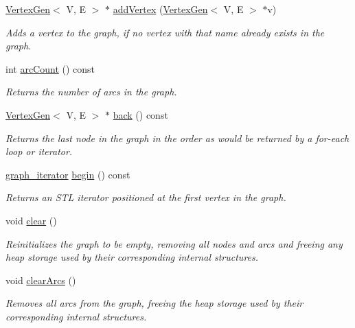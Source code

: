 \begin{DoxyCompactItemize}
\mbox{\hyperlink{classVertexGen}{Vertex\+Gen}}$<$ V, E $>$ $\ast$ \mbox{\hyperlink{classBasicGraphGen_a99facea785e991d862eef401807c5f79}{add\+Vertex}} (\mbox{\hyperlink{classVertexGen}{Vertex\+Gen}}$<$ V, E $>$ $\ast$v)
\begin{DoxyCompactList}\small\item\em Adds a vertex to the graph, if no vertex with that name already exists in the graph. \end{DoxyCompactList}\item 
int \mbox{\hyperlink{classGraph_ac0b108b3354f5222d2c829dcd639fa7a}{arc\+Count}} () const
\begin{DoxyCompactList}\small\item\em Returns the number of arcs in the graph. \end{DoxyCompactList}\item 
\mbox{\hyperlink{classVertexGen}{Vertex\+Gen}}$<$ V, E $>$ $\ast$ \mbox{\hyperlink{classGraph_a27d59ef129bb56cc144ecc81c0affd34}{back}} () const
\begin{DoxyCompactList}\small\item\em Returns the last node in the graph in the order as would be returned by a for-\/each loop or iterator. \end{DoxyCompactList}\item 
\mbox{\hyperlink{classGraph_a695969c31e87f9e8319d74e5ca39024b}{graph\+\_\+iterator}} \mbox{\hyperlink{classGraph_aea3a8950c46f4ac913207201b685e715}{begin}} () const
\begin{DoxyCompactList}\small\item\em Returns an S\+TL iterator positioned at the first vertex in the graph. \end{DoxyCompactList}\item 
void \mbox{\hyperlink{classGraph_ac8bb3912a3ce86b15842e79d0b421204}{clear}} ()
\begin{DoxyCompactList}\small\item\em Reinitializes the graph to be empty, removing all nodes and arcs and freeing any heap storage used by their corresponding internal structures. \end{DoxyCompactList}\item 
void \mbox{\hyperlink{classGraph_a63f0ce1806df1c8070d997153363eecb}{clear\+Arcs}} ()
\begin{DoxyCompactList}\small\item\em Removes all arcs from the graph, freeing the heap storage used by their corresponding internal structures. \end{DoxyCompactList}\item 

\end{DoxyCompactItemize}

